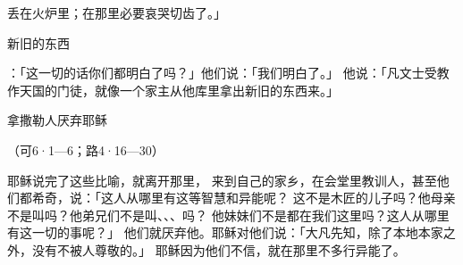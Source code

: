 {丢在火炉里；在那里必要哀哭切齿了。」
\par }{\SH 新旧的东西
\par }{\PP {}：「这一切的话你们都明白了吗？」他们说：「我们明白了。」
他说：「凡文士受教作天国的门徒，就像一个家主从他库里拿出新旧的东西来。」
\par }{\SH 拿撒勒人厌弃耶稣
\par }{\R （可6·1—6；路4·16—30）
\par }{\PP {}耶稣说完了这些比喻，就离开那里，
来到自己的家乡，在会堂里教训人，甚至他们都希奇，说：「这人从哪里有这等智慧和异能呢？
这不是木匠的儿子吗？他母亲不是叫{}吗？他弟兄们不是叫{}、{}、{}、{}吗？
他妹妹们不是都在我们这里吗？这人从哪里有这一切的事呢？」
他们就厌弃他。耶稣对他们说：「大凡先知，除了本地本家之外，没有不被人尊敬的。」
耶稣因为他们不信，就在那里不多行异能了。

}
